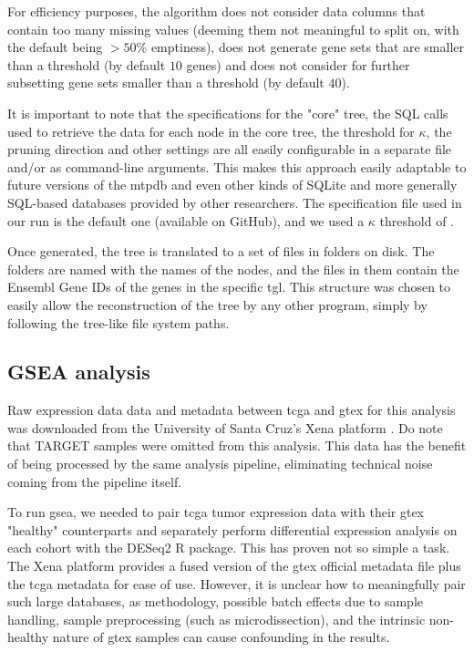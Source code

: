 For efficiency purposes, the algorithm does not consider data columns that contain too many missing values (deeming them not meaningful to split on, with the default being $> 50\%$ emptiness), does not generate gene sets that are smaller than a threshold (by default $10$ genes) and does not consider for further subsetting gene sets smaller than a threshold (by default $40$).

It is important to note that the specifications for the "core" tree, the SQL calls used to retrieve the data for each node in the core tree, the threshold for $\kappa$, the pruning direction and other settings are all easily configurable in a separate file and/or as command-line arguments. This makes this approach easily adaptable to future versions of the \gls{mtpdb} and even other kinds of SQLite and more generally SQL-based databases provided by other researchers. The specification file used in our run is the default one (available on GitHub), and we used a $\kappa$ threshold of .

Once generated, the tree is translated to a set of files in folders on disk. The folders are named with the names of the nodes, and the  files in them contain the Ensembl Gene IDs of the genes in the specific \gls{tgl}. This structure was chosen to easily allow the reconstruction of the tree by any other program, simply by following the tree-like file system paths.

\subsection{GSEA analysis}
Raw expression data data and metadata between \gls{tcga} and \gls{gtex} for this analysis was downloaded from the University of Santa Cruz's Xena platform \cite{UCSCXena}. Do note that TARGET samples were omitted from this analysis. This data has the benefit of being processed by the same analysis pipeline, eliminating technical noise coming from the pipeline itself. %

To run \gls{gsea}, we needed to pair \gls{tcga} tumor expression data with their \gls{gtex} "healthy" counterparts and separately perform differential expression analysis on each cohort with the DESeq2 R package. This has proven not so simple a task. The Xena platform provides a fused version of the \gls{gtex} official metadata file plus the \gls{tcga} metadata for ease of use. However, it is unclear how to meaningfully pair such large databases, as methodology, possible batch effects due to sample handling, sample preprocessing (such as microdissection), and the intrinsic non-healthy nature of \gls{gtex} samples can cause confounding in the results. 

